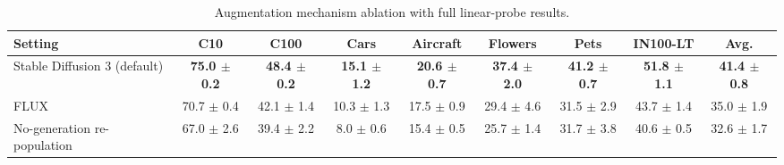 \begin{table}[H]
\centering
\scriptsize
\setlength{\tabcolsep}{3.5pt}
\caption{Augmentation mechanism ablation with full linear-probe results.}
\label{tab:app_generation_linear}
\begin{adjustbox}{width=\textwidth}
\begin{tabular}{l c c c c c c c c}
\toprule
Setting & C10 & C100 & Cars & Aircraft & Flowers & Pets & IN100-LT & Avg. \\
\midrule
Stable Diffusion 3 (default) & \textbf{75.0 {\scriptsize$\pm$ 0.2}} & \textbf{48.4 {\scriptsize$\pm$ 0.2}} & \textbf{15.1 {\scriptsize$\pm$ 1.2}} & \textbf{20.6 {\scriptsize$\pm$ 0.7}} & \textbf{37.4 {\scriptsize$\pm$ 2.0}} & \textbf{41.2 {\scriptsize$\pm$ 0.7}} & \textbf{51.8 {\scriptsize$\pm$ 1.1}} & \textbf{41.4 {\scriptsize$\pm$ 0.8}} \\
FLUX & 70.7 {\scriptsize$\pm$ 0.4} & 42.1 {\scriptsize$\pm$ 1.4} & 10.3 {\scriptsize$\pm$ 1.3} & 17.5 {\scriptsize$\pm$ 0.9} & 29.4 {\scriptsize$\pm$ 4.6} & 31.5 {\scriptsize$\pm$ 2.9} & 43.7 {\scriptsize$\pm$ 1.4} & 35.0 {\scriptsize$\pm$ 1.9} \\
No-generation re-population & 67.0 {\scriptsize$\pm$ 2.6} & 39.4 {\scriptsize$\pm$ 2.2} & 8.0 {\scriptsize$\pm$ 0.6} & 15.4 {\scriptsize$\pm$ 0.5} & 25.7 {\scriptsize$\pm$ 1.4} & 31.7 {\scriptsize$\pm$ 3.8} & 40.6 {\scriptsize$\pm$ 0.5} & 32.6 {\scriptsize$\pm$ 1.7} \\
\bottomrule
\end{tabular}
\end{adjustbox}
\end{table}
